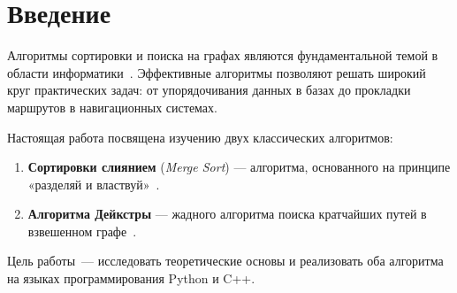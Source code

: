 \chapter{Введение}

Алгоритмы сортировки и поиска на графах являются фундаментальной темой
в области информатики~\cite{cormen2022}. Эффективные алгоритмы позволяют
решать широкий круг практических задач: от упорядочивания данных в базах
до прокладки маршрутов в навигационных системах.

Настоящая работа посвящена изучению двух классических алгоритмов:

\begin{enumerate}
  \item \textbf{Сортировки слиянием} (\textit{Merge Sort}) — алгоритма,
        основанного на принципе «разделяй и властвуй»~\cite{knuth1997}.
  \item \textbf{Алгоритма Дейкстры} — жадного алгоритма поиска
        кратчайших путей в взвешенном графе~\cite{dijkstra1959}.
\end{enumerate}

Цель работы~--- исследовать теоретические основы и реализовать оба
алгоритма на языках программирования Python и C++.

